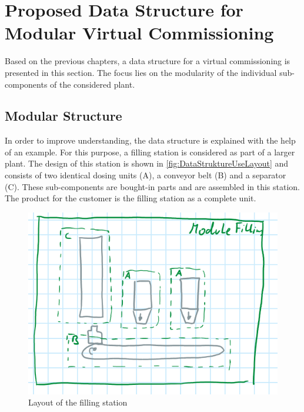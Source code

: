\section{Proposed Data Structure for Modular Virtual Commissioning} \label{sec:DataStructure}
	Based on the previous chapters, a data structure for a virtual commissioning is presented in this section. The focus lies on the modularity of the individual sub-components of the considered plant. 

\subsection{Modular Structure}
	In order to improve understanding, the data structure is explained with the help of an example. For this purpose, a filling station is considered as part of a larger plant. The design of this station is shown in \autoref{fig:DataStruktureUseLayout} and consists of two identical dosing units (A), a conveyor belt (B) and a separator (C). These sub-components are bought-in parts and are assembled in this station. The product for the customer is the filling station as a complete unit.  \\
	\begin{figure}[htp]
		\centering
		\includegraphics[width=.7\linewidth]{figures/StruktureCad.PNG}
		\caption{Layout of the filling station}
		\label{fig:DataStruktureUseLayout}
	\end{figure}

